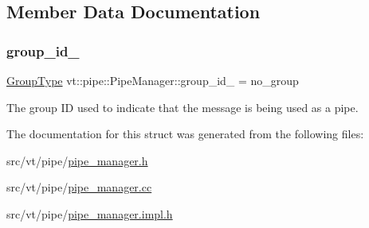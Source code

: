 \subsection{Member Data Documentation}
\mbox{\label{structvt_1_1pipe_1_1_pipe_manager_a55c4e1e68f74a2a0796a24ea06711563}} 
\subsubsection{\texorpdfstring{group\+\_\+id\+\_\+}{group\_id\_}}
{\footnotesize\ttfamily \hyperlink{namespacevt_a27b5e4411c9b6140c49100e050e2f743}{Group\+Type} vt\+::pipe\+::\+Pipe\+Manager\+::group\+\_\+id\+\_\+ = no\+\_\+group\hspace{0.3cm}{\ttfamily [private]}}



The group ID used to indicate that the message is being used as a pipe. 



The documentation for this struct was generated from the following files\+:\begin{DoxyCompactItemize}
\item 
src/vt/pipe/\hyperlink{pipe__manager_8h}{pipe\+\_\+manager.\+h}\item 
src/vt/pipe/\hyperlink{pipe__manager_8cc}{pipe\+\_\+manager.\+cc}\item 
src/vt/pipe/\hyperlink{pipe__manager_8impl_8h}{pipe\+\_\+manager.\+impl.\+h}\end{DoxyCompactItemize}
